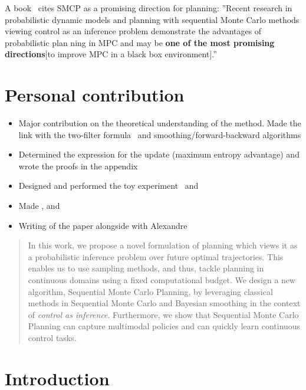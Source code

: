 A book~\citep{belousov2021reinforcement} cites SMCP as a promising direction for planning: ''Recent research in probabilistic dynamic models and planning
with sequential Monte Carlo methods viewing control as an inference problem demonstrate the advantages of probabilistic plan
ning in MPC and may be \textbf{one of the most promising directions}[to improve MPC in a black box environment].''


\section*{Personal contribution}
\begin{itemize}
    \item Major contribution on the theoretical understanding of the method. Made the link with the two-filter formula~\citep{bresler1986two} and smoothing/forward-backward algorithms
    \item Determined the expression for the update (maximum entropy advantage) and wrote the proofs in the appendix
    \item Designed and performed the toy experiment~ and 
    \item Made ,  and 
    \item Writing of the paper alongside with Alexandre
\end{itemize}

\newpage
\begin{abstract}
In this work, we propose  a novel formulation of planning which views it as a probabilistic inference problem over future optimal trajectories. This enables us to use sampling methods, and thus, tackle planning in continuous %
domains using a fixed computational budget.  We design a new algorithm, Sequential Monte Carlo Planning, by leveraging classical methods in Sequential Monte Carlo and Bayesian smoothing in the context of \textit{control as inference}.  %
Furthermore, we show that Sequential Monte Carlo Planning can capture multimodal policies and can quickly learn continuous control tasks. %
\end{abstract}

\section{Introduction}


